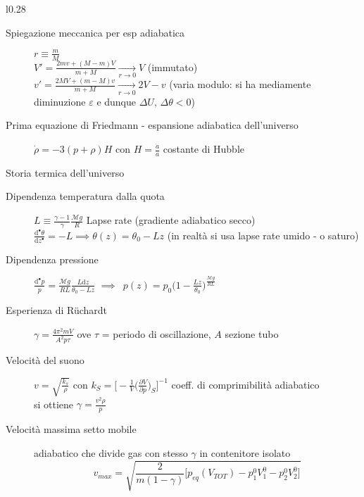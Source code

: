 \documentclass[10pt, oneside]{article}
\begin{document}
\begin{wrapfigure}{l}{0.28\textwidth}
\centering
{}
\vspace{-2cm}
\end{wrapfigure}
\noindent \begin{description}
\item[Spiegazione meccanica per esp adiabatica] $\displaystyle r \equiv \frac{m}{M}$
\\$\displaystyle V' = \frac{2m v + (M - m) V}{m+M} \xrightarrow[r \rightarrow 0]{} V$ (immutato) \\$\displaystyle v' = \frac{2M V + (m-M)v}{m+M} \xrightarrow[r \rightarrow 0]{} 2V - v$ (varia modulo: si ha mediamente diminuzione $\varepsilon$ e dunque $\Delta U, \, \Delta \theta < 0$)
\item[Prima equazione di Friedmann - espansione adiabatica dell'universo]
$\displaystyle \dot \rho = -3(p + \rho)H$ con $\displaystyle H = \frac{\dot a}{a}$ costante di Hubble
\item[Storia termica dell'universo]
\end{description}
\indent
\begin{description}
\item[Dipendenza temperatura dalla quota] $\displaystyle L \equiv \frac{\gamma - 1}{\gamma} \frac{\mathcal{M} g}{R}$ Lapse rate (gradiente adiabatico secco) $\displaystyle \frac{\mathrm{d}^{•} \theta}{\mathrm{d}z^{•}} = -L \implies \theta(z) = \theta_0 - Lz$ (in realtà si usa lapse rate umido - o saturo)
\item[Dipendenza pressione]$\displaystyle \frac{\mathrm{d}^{•} p}{p} = \frac{\mathcal{M}g}{RL}\frac{L \mathrm{d}z}{\theta_0 - Lz}$ $\implies \enspace p(z) = p_0 \bigg(\displaystyle 1 - \frac{Lz}{\theta_0}\bigg)^{\displaystyle \frac{\mathcal{M}g}{RL}}$
\item[Esperienza di R\"uchardt] $\displaystyle \gamma = \frac{4 \pi^2 mV}{A^2 p \tau}$ ove $\tau$ = periodo di oscillazione, $A$ sezione tubo
\item[Velocità del suono]$\displaystyle v = \sqrt{\frac{k_s}{\rho}}$ con $\displaystyle k_S = \bigg[-\frac{1}{V} \bigg(\frac{\partial V}{\partial p}\bigg)_S\bigg]^{-1}$ coeff. di comprimibilità adiabatico
\\si ottiene $\displaystyle \gamma = \frac{v^2 \rho}{p}$
\item[Velocità massima setto mobile] adiabatico che divide gas con stesso $\gamma$ in contenitore isolato
\[v_{max} = \sqrt{\frac{2}{m(1-\gamma)} \bigg[p_{eq}(V_{TOT}) - p_1^0 V_1^0 - p_2^0 V_2^0\bigg]}\]
\end{description}
\end{document}
